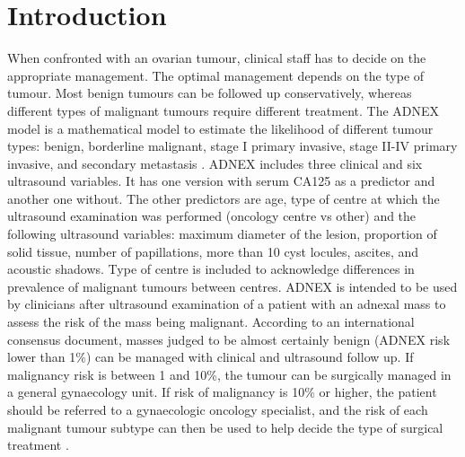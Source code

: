 \vspace{0.5cm}

\newpage

\section{Introduction}

When confronted with an ovarian tumour, clinical staff has to decide on the appropriate management. The optimal management depends on the type of tumour. Most benign tumours can be followed up conservatively, whereas different types of malignant tumours require different treatment. The \gls{ADNEX} model is a mathematical model to estimate the likelihood of different tumour types: benign, borderline malignant, stage I primary invasive, stage II-IV primary invasive, and secondary metastasis \cite{vancalsterEvaluatingRiskOvarian2014}. \gls{ADNEX} includes three clinical and six ultrasound variables. It has one version with serum \gls{CA125} as a predictor and another one without. The other predictors are age, type of centre at which the ultrasound examination was performed (oncology centre vs other) and the following ultrasound variables: maximum diameter of the lesion, proportion of solid tissue, number of papillations, more than 10 cyst locules, ascites, and acoustic shadows. Type of centre is included to acknowledge differences in prevalence of malignant tumours between centres. \gls{ADNEX} is intended to be used by clinicians after ultrasound examination of a patient with an adnexal mass to assess the risk of the mass being malignant. According to an international consensus document, masses judged to be almost certainly benign (\gls{ADNEX} risk lower than 1\%) can be managed with clinical and ultrasound follow up. If malignancy risk is between 1 and 10\%, the tumour can be surgically managed in a general gynaecology unit. If risk of malignancy is 10\% or higher, the patient should be referred to a gynaecologic oncology specialist, and the risk of each malignant tumour subtype can then be used to help decide the type of surgical treatment \cite{timmermanESGOISUOGIOTA2021}.

